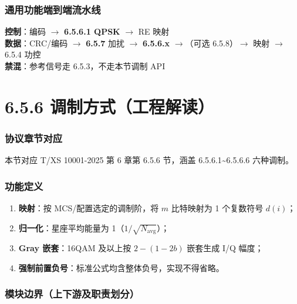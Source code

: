 \documentclass[11pt,a4paper]{ctexart}
\begin{document}
\section{通用功能端到端流水线}

\begin{center}
\small
\textbf{控制}：编码 $\rightarrow$ \textbf{6.5.6.1 QPSK} $\rightarrow$ RE 映射\\[0.3em]
\textbf{数据}：CRC/编码 $\rightarrow$ \textbf{6.5.7} 加扰 $\rightarrow$ \textbf{6.5.6.x} $\rightarrow$（可选 6.5.8）$\rightarrow$ 映射 $\rightarrow$ 6.5.4 功控\\[0.3em]
\textbf{禁混}：参考信号走 6.5.3，不走本节调制 API
\end{center}

\newpage
\part{6.5.6 调制方式（工程解读）}

\section{协议章节对应}

本节对应 T/XS 10001-2025 第 6 章第 6.5.6 节，涵盖 6.5.6.1\textasciitilde 6.5.6.6 六种调制。

\section{功能定义}

\begin{enumerate}[nosep]
  \item \textbf{映射}：按 MCS/配置选定的调制阶，将 $m$ 比特映射为 1 个复数符号 $d(i)$；
  \item \textbf{归一化}：星座平均能量为 1（$1/\sqrt{N_{\mathrm{avg}}}$）；
  \item \textbf{Gray 嵌套}：16QAM 及以上按 $2-(1-2b)$ 嵌套生成 I/Q 幅度；
  \item \textbf{强制前置负号}：标准公式均含整体负号，实现不得省略。
\end{enumerate}

\section{模块边界（上下游及职责划分）}
\end{document}
